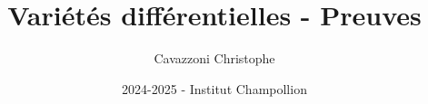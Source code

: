 \documentclass{report}
\title{Variétés différentielles - Preuves}
\author{Cavazzoni Christophe}
\date{2024-2025 - Institut Champollion}
\begin{document}
   \maketitle
   
   \pagebreak   
   
   \pagebreak   
   
   \pagebreak   
\end{document}
